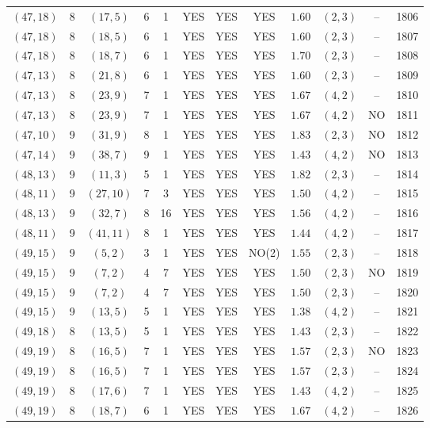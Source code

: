 \begin{longtable}{|c|c|c|c|c|c|c|c|c|c|c|c|}
$(47,18)$ & 8 & $(17,5)$ & 6 & 1 & YES & YES & YES & $1.60$ & $(2,3)$ & -- & 1806\\
$(47,18)$ & 8 & $(18,5)$ & 6 & 1 & YES & YES & YES & $1.60$ & $(2,3)$ & -- & 1807\\
$(47,18)$ & 8 & $(18,7)$ & 6 & 1 & YES & YES & YES & $1.70$ & $(2,3)$ & -- & 1808\\
$(47,13)$ & 8 & $(21,8)$ & 6 & 1 & YES & YES & YES & $1.60$ & $(2,3)$ & -- & 1809\\
$(47,13)$ & 8 & $(23,9)$ & 7 & 1 & YES & YES & YES & $1.67$ & $(4,2)$ & -- & 1810\\
$(47,13)$ & 8 & $(23,9)$ & 7 & 1 & YES & YES & YES & $1.67$ & $(4,2)$ & NO & 1811\\
$(47,10)$ & 9 & $(31,9)$ & 8 & 1 & YES & YES & YES & $1.83$ & $(2,3)$ & NO & 1812\\
$(47,14)$ & 9 & $(38,7)$ & 9 & 1 & YES & YES & YES & $1.43$ & $(4,2)$ & NO & 1813\\
$(48,13)$ & 9 & $(11,3)$ & 5 & 1 & YES & YES & YES & $1.82$ & $(2,3)$ & -- & 1814\\
$(48,11)$ & 9 & $(27,10)$ & 7 & 3 & YES & YES & YES & $1.50$ & $(4,2)$ & -- & 1815\\
$(48,13)$ & 9 & $(32,7)$ & 8 & 16 & YES & YES & YES & $1.56$ & $(4,2)$ & -- & 1816\\
$(48,11)$ & 9 & $(41,11)$ & 8 & 1 & YES & YES & YES & $1.44$ & $(4,2)$ & -- & 1817\\
$(49,15)$ & 9 & $(5,2)$ & 3 & 1 & YES & YES & NO(2) & $1.55$ & $(2,3)$ & -- & 1818\\
$(49,15)$ & 9 & $(7,2)$ & 4 & 7 & YES & YES & YES & $1.50$ & $(2,3)$ & NO & 1819\\
$(49,15)$ & 9 & $(7,2)$ & 4 & 7 & YES & YES & YES & $1.50$ & $(2,3)$ & -- & 1820\\
$(49,15)$ & 9 & $(13,5)$ & 5 & 1 & YES & YES & YES & $1.38$ & $(4,2)$ & -- & 1821\\
$(49,18)$ & 8 & $(13,5)$ & 5 & 1 & YES & YES & YES & $1.43$ & $(2,3)$ & -- & 1822\\
$(49,19)$ & 8 & $(16,5)$ & 7 & 1 & YES & YES & YES & $1.57$ & $(2,3)$ & NO & 1823\\
$(49,19)$ & 8 & $(16,5)$ & 7 & 1 & YES & YES & YES & $1.57$ & $(2,3)$ & -- & 1824\\
$(49,19)$ & 8 & $(17,6)$ & 7 & 1 & YES & YES & YES & $1.43$ & $(4,2)$ & -- & 1825\\
$(49,19)$ & 8 & $(18,7)$ & 6 & 1 & YES & YES & YES & $1.67$ & $(4,2)$ & -- & 1826\\

\end{longtable}
